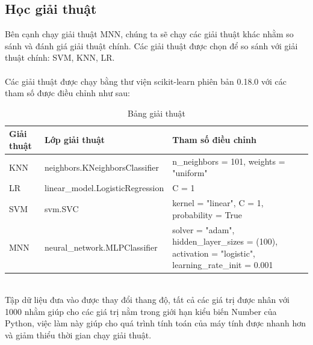 \subsection{Học giải thuật}
Bên cạnh chạy giải thuật MNN, chúng ta sẽ chạy các giải thuật khác nhằm so sánh 
và đánh giá giải thuật chính. Các giải thuật được chọn để so sánh với giải thuật 
chính: SVM, KNN, LR.\\\\
Các giải thuật được chạy bằng thư viện scikit-learn phiên bản 0.18.0 với các 
tham số được điều chỉnh như sau:
\begin{table}[h]
\begin{tabularx}{\textwidth}{ |l|l|X| }
\hline
Giải thuật & Lớp giải thuật & Tham số điều chỉnh \\
\hline
KNN & neighbors.KNeighborsClassifier & n\_neighbors = 101, weights = "uniform" \\
\hline
LR & linear\_model.LogisticRegression & C = 1 \\
\hline
SVM & svm.SVC & kernel = "linear", C = 1, probability = True\\
\hline
MNN & neural\_network.MLPClassifier & solver = "adam", hidden\_layer\_sizes = (100), activation = "logistic", learning\_rate\_init = 0.001 \\
\hline
\end{tabularx}
\caption{Bảng giải thuật}
\end{table}\\
Tập dữ liệu đưa vào được thay đổi thang độ, tất cả các giá trị được nhân với 
1000 nhằm giúp cho các giá trị nằm trong giới hạn kiểu biến Number của Python, 
việc làm này giúp cho quá trình tính toán của máy tính được nhanh hơn và giảm 
thiểu thời gian chạy giải thuật.
